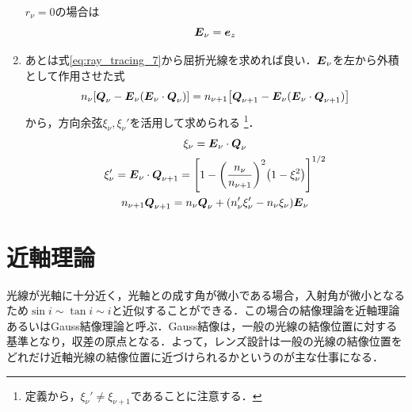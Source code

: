 \documentclass{jsarticle}
\begin{document}
\begin{enumerate}
    $r_\nu=0$の場合は
        \begin{equation}
            \vb*{E}_\nu=\vb*{e}_z
        \end{equation}
    \item あとは式\eqref{eq:ray_tracing_7}から屈折光線を求めれば良い．$\vb*{E}_\nu$を左から外積として作用させた式
        \begin{equation}
            n_\nu\qty[\vb*{Q}_\nu-\vb*{E}_\nu(\vb*{E}_\nu\cdot\vb*{Q}_\nu)]=n_{\nu+1}\qty[\vb*{Q}_{\nu+1}-\vb*{E}_\nu(\vb*{E}_\nu\cdot\vb*{Q}_{\nu+1})]
        \end{equation}
    から，方向余弦$\xi_\nu, \xi_\nu'$を活用して求められる
    \footnote{
        定義から，$\xi_\nu'\neq \xi_{\nu+1}$であることに注意する．
    }．
        \begin{gather}
            \xi_\nu=\vb*{E}_\nu\cdot\vb*{Q}_\nu\\
            \xi_\nu'=\vb*{E}_\nu\cdot\vb*{Q}_{\nu+1}=\qty[1-\qty(\frac{n_\nu}{n_{\nu+1}})^2\qty(1-\xi_\nu^2)]^{1/2}\\
            n_{\nu+1}\vb*{Q}_{\nu+1}=n_\nu\vb*{Q}_\nu+\qty(n_{\nu}'\xi_\nu'-n_\nu\xi_\nu)\vb*{E}_\nu
            \label{eq:ray_tracing_q}
        \end{gather}
\end{enumerate}

\section{近軸理論}
\label{sec:paraxial_tracing}
光線が光軸に十分近く，光軸との成す角が微小である場合，入射角が微小となるため$\sin i\sim\tan i\sim i$と近似することができる．この場合の結像理論を近軸理論あるいはGauss結像理論と呼ぶ．Gauss結像は，一般の光線の結像位置に対する基準となり，収差の原点となる．よって，レンズ設計は一般の光線の結像位置をどれだけ近軸光線の結像位置に近づけられるかというのが主な仕事になる．
\end{document}
